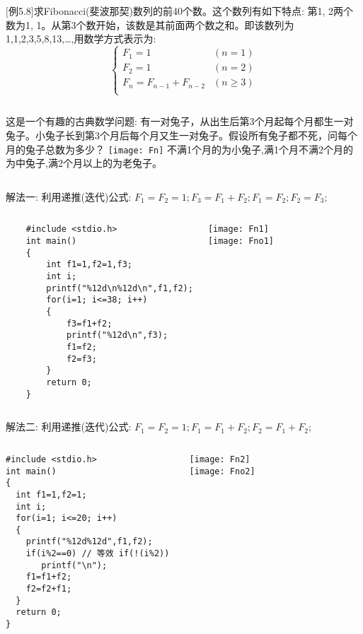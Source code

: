 \begin{frame}
\small
$[$例5.8$]$求Fibonacci(斐波那契)数列的前40个数。这个数列有如下特点: 第1, 2两个数为1, 1。从第3个数开始，该数是其前面两个数之和。即该数列为1,1,2,3,5,8,13,\dots,用数学方式表示为:
\[
\begin{cases}
F_1=1 & (n=1)\\
F_2=1 & (n=2)\\
F_n=F_{n-1}+F_{n-2} & (n\ge 3)\\
\end{cases}
\]
\begin{columns}
	这是一个有趣的古典数学问题: 有一对兔子，从出生后第3个月起每个月都生一对兔子。小兔子长到第3个月后每个月又生一对兔子。假设所有兔子都不死，问每个月的兔子总数为多少？
	\texttt{[image: Fn]}
	\scriptsize
	不满1个月的为小兔子,满1个月不满2个月的为中兔子,满2个月以上的为老兔子。
\end{columns}
\end{frame}

\begin{frame}
解法一: 利用递推(迭代)公式: $F_1=F_2=1; F_3=F_1+F_2; F_1=F_2; F_2=F_3; $
\begin{columns}
	\begin{lstlisting}
    #include <stdio.h>
    int main()
    {
        int f1=1,f2=1,f3;
        int i;
        printf("%12d\n%12d\n",f1,f2);
        for(i=1; i<=38; i++)
        {
            f3=f1+f2;
            printf("%12d\n",f3);
            f1=f2;
            f2=f3;
        }
        return 0;
    }
    \end{lstlisting}
	\texttt{[image: Fn1]}\\
	\texttt{[image: Fno1]}
\end{columns}
\end{frame}

\begin{frame}
解法二: 利用递推(迭代)公式: $F_1=F_2=1; F_1=F_1+F_2; F_2=F_1+F_2; $
\begin{columns}
\begin{lstlisting}
#include <stdio.h>
int main()
{
  int f1=1,f2=1;
  int i;
  for(i=1; i<=20; i++)
  {
    printf("%12d%12d",f1,f2);
    if(i%2==0) // 等效 if(!(i%2)) 
       printf("\n");
    f1=f1+f2;
    f2=f2+f1;
  }
  return 0;
}
\end{lstlisting}
	\texttt{[image: Fn2]}\\
	\texttt{[image: Fno2]}
\end{columns}
\end{frame}

